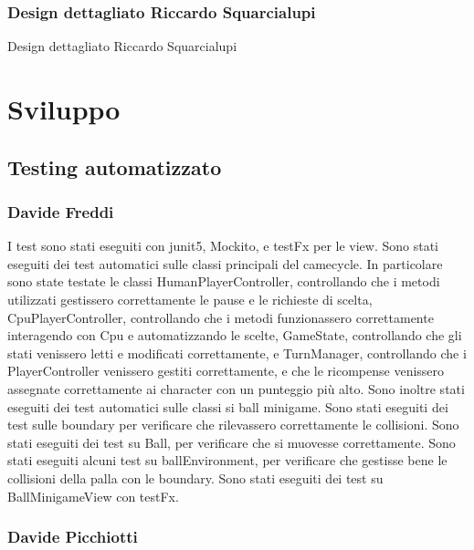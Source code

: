 \documentclass[a4paper,12pt]{report}
\begin{document}
	\subsection{Design dettagliato Riccardo Squarcialupi}
	Design dettagliato Riccardo Squarcialupi

	\chapter{Sviluppo}
	\section{Testing automatizzato}

	\subsection{Davide Freddi}
	I test sono stati eseguiti con junit5, Mockito, e testFx per le view.
    Sono stati eseguiti dei test automatici sulle classi principali del camecycle.
    In particolare sono state testate le classi HumanPlayerController, controllando che i metodi utilizzati gestissero correttamente le pause e le richieste di scelta, CpuPlayerController, controllando che i metodi funzionassero correttamente interagendo con Cpu e automatizzando le scelte, GameState, controllando che gli stati venissero letti e modificati correttamente, e TurnManager, controllando che i PlayerController venissero gestiti correttamente, e che le ricompense venissero assegnate correttamente ai character con un punteggio più alto.
    Sono inoltre stati eseguiti dei test automatici sulle classi si ball minigame.
    Sono stati eseguiti dei test sulle boundary per verificare che rilevassero correttamente le collisioni.
    Sono stati eseguiti dei test su Ball, per verificare che si muovesse correttamente.
    Sono stati eseguiti alcuni test su ballEnvironment, per verificare che gestisse bene le collisioni della palla con le boundary.
    Sono stati eseguiti dei test su BallMinigameView con testFx.
	\subsection{Davide Picchiotti}
\end{document}

